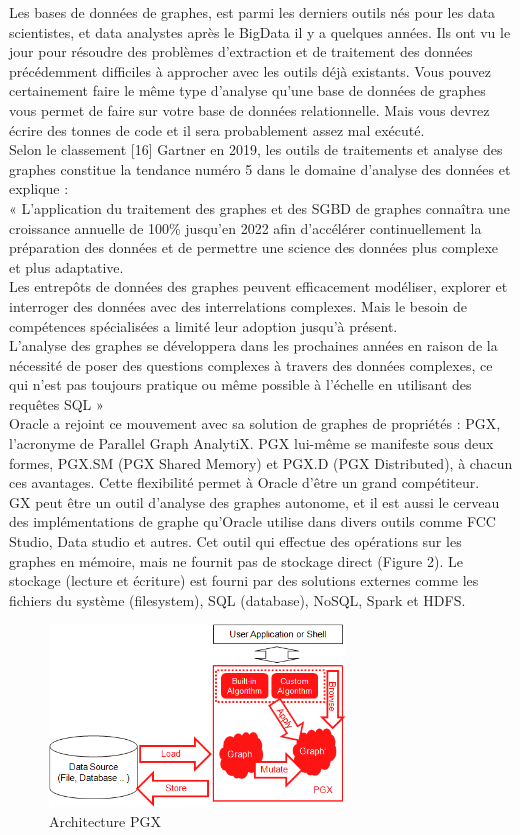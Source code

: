 Les bases de données de graphes, est parmi les derniers outils nés pour les data scientistes, et data analystes après le BigData il y a quelques années. Ils ont vu le jour pour résoudre des problèmes d’extraction et de traitement des données précédemment difficiles à approcher avec les outils déjà existants. Vous pouvez certainement faire le même type d'analyse qu'une base de données de graphes vous permet de faire sur votre base de données relationnelle. Mais vous devrez écrire des tonnes de code et il sera probablement assez mal exécuté.\\
Selon le classement [16] Gartner en 2019, les outils de traitements et analyse des graphes constitue la tendance numéro 5 dans le domaine d’analyse des données et explique : \\
« L'application du traitement des graphes et des SGBD de graphes connaîtra une croissance annuelle de 100\% jusqu'en 2022 afin d'accélérer continuellement la préparation des données et de permettre une science des données plus complexe et plus adaptative. \\
Les entrepôts de données des graphes peuvent efficacement modéliser, explorer et interroger des données avec des interrelations complexes. Mais le besoin de compétences spécialisées a limité leur adoption jusqu'à présent.\\
L'analyse des graphes se développera dans les prochaines années en raison de la nécessité de poser des questions complexes à travers des données complexes, ce qui n'est pas toujours pratique ou même possible à l'échelle en utilisant des requêtes SQL »\\
Oracle a rejoint ce mouvement avec sa solution de graphes de propriétés : PGX, l'acronyme de Parallel Graph AnalytiX. PGX lui-même se manifeste sous deux formes, PGX.SM (PGX Shared Memory) et PGX.D (PGX Distributed), à chacun ces avantages. Cette flexibilité permet à Oracle d’être un grand compétiteur.\\
GX peut être un outil d’analyse des graphes autonome, et il est aussi le cerveau des implémentations de graphe qu'Oracle utilise dans divers outils comme FCC Studio, Data studio et autres. Cet outil qui effectue des opérations sur les graphes en mémoire, mais ne fournit pas de stockage direct (Figure 2). Le stockage (lecture et écriture) est fourni par des solutions externes comme les fichiers du système (filesystem), SQL (database), NoSQL, Spark et HDFS.\\

\begin{figure}[h!]  
  \centering
    \includegraphics[width=0.7\textwidth]{chapitre1/Figures/pgx_overview.png}
  \caption{Architecture PGX}
\end{figure}


